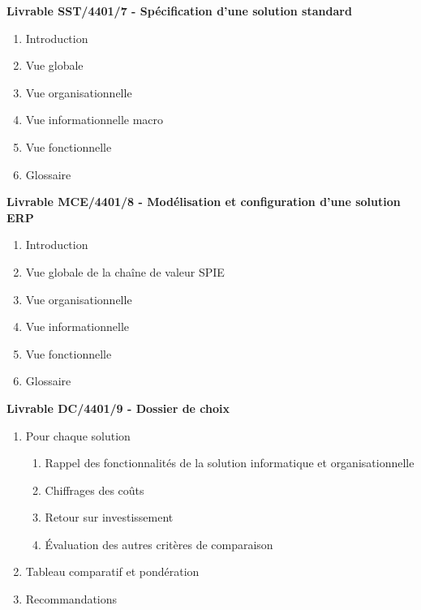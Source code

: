 \bf{Livrable SST/4401/7 - Spécification d’une solution standard} \\

\begin{enumerate}
    \item Introduction
    \item Vue globale 
    \item Vue organisationnelle 
    \item Vue informationnelle macro 
    \item Vue fonctionnelle
    \item Glossaire \\
\end{enumerate}

\bf{Livrable MCE/4401/8 - Modélisation et configuration d’une solution ERP} \\

\begin{enumerate}
    \item Introduction
    \item Vue globale de la chaîne de valeur SPIE
    \item Vue organisationnelle 
    \item Vue informationnelle 
    \item Vue fonctionnelle
    \item Glossaire  \\
\end{enumerate}

\bf{Livrable DC/4401/9 - Dossier de choix} \\

\begin{enumerate}
    \item Pour chaque solution
        \begin{enumerate}
            \item Rappel des fonctionnalités de la solution informatique et organisationnelle
            \item Chiffrages des coûts
            \item Retour sur investissement
            \item Évaluation des autres critères de comparaison
        \end{enumerate}
    \item Tableau comparatif et pondération
    \item Recommandations \\
\end{enumerate}
 
